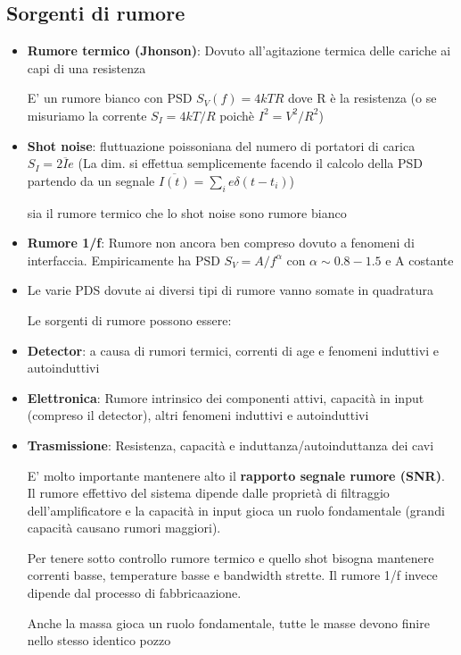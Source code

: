 \subsection{Sorgenti di rumore}
\begin{itemize}
    \item \textbf{Rumore termico (Jhonson)}: Dovuto all'agitazione termica delle cariche ai capi di una resistenza

    E' un rumore bianco con PSD $S_V(f)=4kTR$ dove R è la resistenza (o se misuriamo la corrente $S_I=4kT/R$ poichè $I^2=V^2/R^2$)
  
  \item \textbf{Shot noise}: fluttuazione poissoniana del numero di portatori di carica $S_I=2\overline{I}e$
    (La dim. si effettua semplicemente facendo il calcolo della PSD partendo da un segnale $\overline{I(t)}=\sum_i e\delta(t-t_i)$)
  
   \begin{note}
    sia il rumore termico che lo shot noise sono rumore bianco
   \end{note} 
  
  \item \textbf{Rumore 1/f}: Rumore non ancora ben compreso dovuto a fenomeni di interfaccia. Empiricamente ha PSD $S_V=A/f^\alpha$ con $\alpha \sim 0.8-1.5$ e A costante
  
  \item Le varie PDS dovute ai diversi tipi di rumore vanno somate in quadratura
  
  Le sorgenti di rumore possono essere:
  
  \item \textbf{Detector}: a causa di rumori termici, correnti di age e fenomeni induttivi e autoinduttivi
  \item \textbf{Elettronica}: Rumore intrinsico dei componenti attivi, capacità in input (compreso il detector), altri fenomeni induttivi e autoinduttivi
  \item \textbf{Trasmissione}: Resistenza, capacità e induttanza/autoinduttanza dei cavi
  
  E' molto importante mantenere alto il \textbf{rapporto segnale rumore (SNR)}.
  Il rumore effettivo del sistema dipende dalle proprietà di filtraggio dell'amplificatore e la capacità in input gioca un ruolo fondamentale (grandi capacità causano rumori maggiori).
  
  Per tenere sotto controllo rumore termico e quello shot bisogna mantenere correnti basse, temperature basse e bandwidth strette.
  Il rumore 1/f invece dipende dal processo di fabbricaazione.
  
  Anche la massa gioca un ruolo fondamentale, tutte le masse devono finire nello stesso identico pozzo
\end{itemize}

